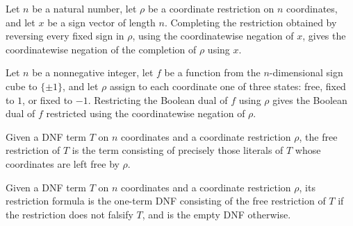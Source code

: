 \begin{theorem}
\label{FABL.CoordRestriction.completeSign_negateAssignment}
\leanok
{}
Let $n$ be a natural number, let $\rho$ be a coordinate restriction on $n$ coordinates,
and let $x$ be a sign vector of length $n$. Completing the restriction obtained by
reversing every fixed sign in $\rho$, using the coordinatewise negation of $x$, gives
the coordinatewise negation of the completion of $\rho$ using $x$.
\end{theorem}

\begin{theorem}
\label{FABL.CoordRestriction.restrictSign_booleanDual}
\leanok
{}
Let $n$ be a nonnegative integer, let $f$ be a function from the $n$-dimensional sign
cube to $\{\pm1\}$, and let $\rho$ assign to each coordinate one of three states: free,
fixed to $1$, or fixed to $-1$. Restricting the Boolean dual of $f$ using $\rho$ gives
the Boolean dual of $f$ restricted using the coordinatewise negation of $\rho$.
\end{theorem}

\begin{definition}
\label{FABL.DNFTerm.freeRestriction}
\leanok
{}
Given a DNF term $T$ on $n$ coordinates and a coordinate restriction $\rho$, the free
restriction of $T$ is the term consisting of precisely those literals of $T$ whose
coordinates are left free by $\rho$.
\end{definition}

\begin{definition}
\label{FABL.DNFTerm.restrictionFormula}
\leanok
{}
Given a DNF term $T$ on $n$ coordinates and a coordinate restriction $\rho$, its
restriction formula is the one-term DNF consisting of the free restriction of $T$ if the
restriction does not falsify $T$, and is the empty DNF otherwise.
\end{definition}

